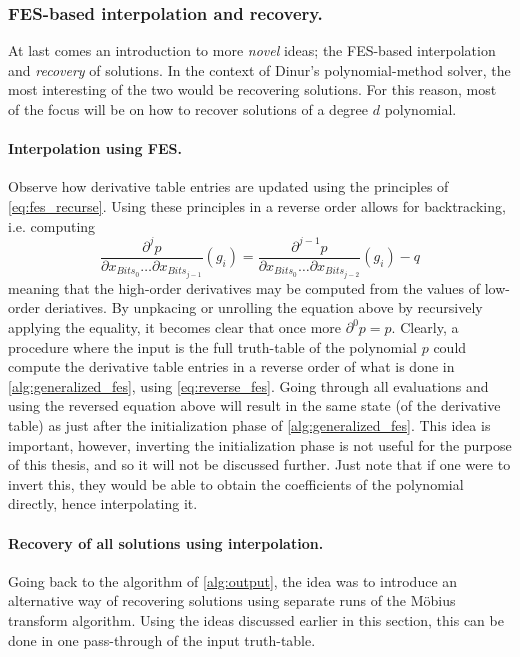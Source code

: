 \subsubsection{FES-based interpolation and recovery.} \label{sec:ext:fes_interp:interp_recover}

At last comes an introduction to more \textit{novel} ideas; the FES-based interpolation and \textit{recovery} of solutions. In the context of Dinur's polynomial-method solver, the most interesting of the two would be recovering solutions. For this reason, most of the focus will be on how to recover solutions of a degree $d$ polynomial.

\paragraph{Interpolation using FES.} Observe how derivative table entries are updated using the principles of \cref{eq:fes_recurse}. Using these principles in a reverse order allows for backtracking, i.e. computing 
\begin{equation} \label{eq:reverse_fes}    
\frac{\partial^j p}{\partial x_{Bits_0} \dots \partial x_{Bits_{j - 1}}}(g_i) = \frac{\partial^{j - 1} p}{\partial x_{Bits_0} \dots \partial x_{Bits_{j - 2}}}(g_i) - q
\end{equation}
meaning that the high-order derivatives may be computed from the values of low-order deriatives. By unpkacing or unrolling the equation above by recursively applying the equality, it becomes clear that once more $\partial^0 p = p$. Clearly, a procedure where the input is the full truth-table of the polynomial $p$ could compute the derivative table entries in a reverse order of what is done in \cref{alg:generalized_fes}, using \cref{eq:reverse_fes}. Going through all evaluations and using the reversed equation above will result in the same state (of the derivative table) as just after the initialization phase of \cref{alg:generalized_fes}. This idea is important, however, inverting the initialization phase is not useful for the purpose of this thesis, and so it will not be discussed further. Just note that if one were to invert this, they would be able to obtain the coefficients of the polynomial directly, hence interpolating it.

\paragraph{Recovery of all solutions using interpolation.} Going back to the algorithm of \cref{alg:output}, the idea was to introduce an alternative way of recovering solutions using separate runs of the Möbius transform algorithm. Using the ideas discussed earlier in this section, this can be done in one pass-through of the input truth-table.

